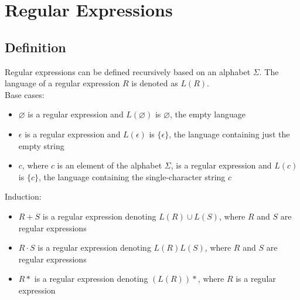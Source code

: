 
\chapter{Regular Expressions}
\section{Definition}
Regular expressions can be defined recursively based on an alphabet $\Sigma$. The language of a regular expression $R$ is denoted as $L(R)$.\\
Base cases:
\begin{itemize}
    \item $\varnothing$ is a regular expression and $L(\varnothing)$ is $\varnothing$, the empty language
    \item $\epsilon$ is a regular expression and $L(\epsilon)$ is $\{\epsilon\}$, the language containing just the empty string
    \item $c$, where $c$ is an element of the alphabet $\Sigma$, is a regular expression and $L(c)$ is $\{c\}$, the language containing the single-character string $c$
\end{itemize}
Induction:
\begin{itemize}
    \item $R+S$ is a regular expression denoting $L(R) \cup L(S)$, where $R$ and $S$ are regular expressions 
    \item $R \cdot S$ is a regular expression denoting $L(R)L(S)$, where $R$ and $S$ are regular expressions
    \item $R*$ is a regular expression denoting $(L(R))*$, where $R$ is a regular expression
\end{itemize}
